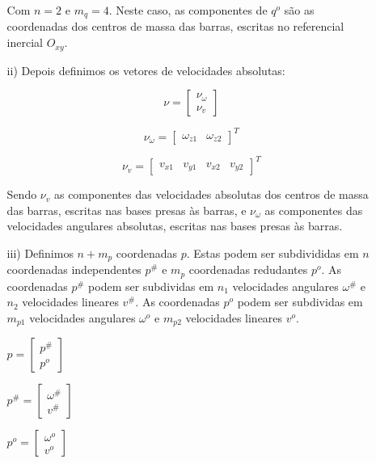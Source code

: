\documentclass[12pt,a4paper]{article}
\begin{document}
\begin{itemize}
\begin{itemize}
	Com $n = 2$ e $m_q = 4$. Neste caso, as componentes de $q^o$ são as coordenadas dos centros de massa das barras, escritas no referencial 	inercial $O_{xy}$. \\
	
	\item[ii)] Depois definimos os vetores de velocidades absolutas:
	
	$$ \nu =
	\begin{bmatrix}
	\nu_\omega \\
	\nu_v
	\end{bmatrix}
	$$
	
	\begin{equation}
	\nu_\omega = \begin{bmatrix}
	\omega_{z1} & \omega_{z2}
	\end{bmatrix}^T
	\end{equation}
	
	\begin{equation}
	\nu_v = \begin{bmatrix}
	v_{x1} & v_{y1} & v_{x2} & v_{y2}
	\end{bmatrix}^T
	\end{equation}
	
	Sendo $\nu_v$ as componentes das velocidades absolutas dos centros de massa das barras, escritas nas bases presas às barras, e $\nu_\omega$ as componentes das velocidades angulares absolutas, escritas nas bases presas às barras. \\
	
	\item[iii)] Definimos $n + m_p$ coordenadas  $p$. Estas podem ser subdivididas em $n$ coordenadas independentes $p^{\#}$ e $m_p$ coordenadas redudantes $p^o$. As coordenadas $p^{\#}$ podem ser subdividas em $n_1$ velocidades angulares $\omega^{\#}$ e $n_2$ velocidades lineares $v^{\#}$. As coordenadas $p^o$ podem ser subdividas em $m_{p1}$ velocidades angulares $\omega^o$ e $m_{p2}$ velocidades lineares $v^o$.
	
	
	\begin{multicols}{3}
	$ p = \begin{bmatrix}
	p^{\#} \\
	p^o
	\end{bmatrix} $

	$ p^{\#} = \begin{bmatrix}
	\omega^{\#} \\
	v^{\#}
	\end{bmatrix} $

	$ p^o = \begin{bmatrix}
	\omega^o \\
	v^o
	\end{bmatrix} $


\end{multicols}
\end{itemize}
\end{itemize}
\end{document}
